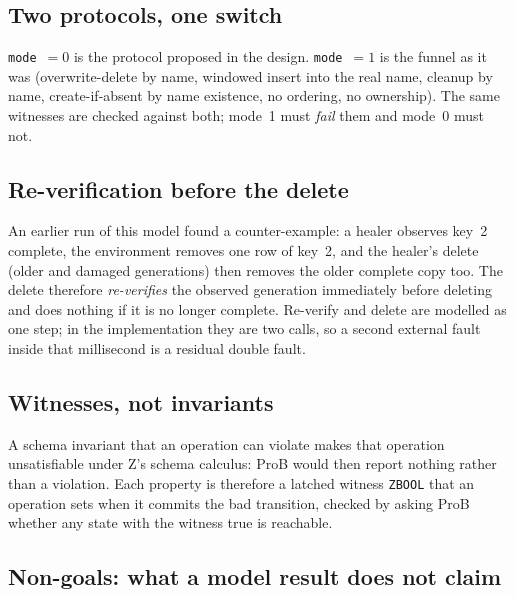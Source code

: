 \documentclass[a4paper,10pt,fleqn]{article}
\newcommand{\field}[1]{\texttt{#1}}
\begin{document}
\subsection{Two protocols, one switch}

\field{mode}~$=0$ is the protocol proposed in the design. \field{mode}~$=1$ is
the funnel as it was (overwrite-delete by name, windowed insert into the real
name, cleanup by name, create-if-absent by name existence, no ordering, no
ownership). The same witnesses are checked against both; mode~1 must
\emph{fail} them and mode~0 must not.

\subsection{Re-verification before the delete}

An earlier run of this model found a counter-example: a healer observes key~2
complete, the environment removes one row of key~2, and the healer's delete
(older and damaged generations) then removes the older complete copy too. The
delete therefore \emph{re-verifies} the observed generation immediately before
deleting and does nothing if it is no longer complete. Re-verify and delete are
modelled as one step; in the implementation they are two calls, so a second
external fault inside that millisecond is a residual double fault.

\subsection{Witnesses, not invariants}

A schema invariant that an operation can violate makes that operation
unsatisfiable under Z's schema calculus: ProB would then report nothing
rather than a violation. Each property is therefore a latched witness
\field{ZBOOL} that an operation sets when it commits the bad transition,
checked by asking ProB whether any state with the witness true is reachable.

\subsection{Non-goals: what a model result does not claim}
\label{sec:nongoals}
\end{document}
